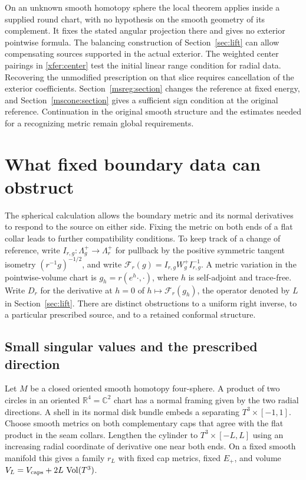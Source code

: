 \documentclass[11pt]{article}
\numberwithin{equation}{section}
\theoremstyle{definition}
\theoremstyle{remark}
\begin{document}
On an unknown smooth homotopy sphere the local theorem applies
inside a supplied round chart, with no hypothesis on the smooth
geometry of its complement. It fixes the stated angular projection
there and gives no exterior pointwise formula. The balancing
construction of Section~\ref{sec:lift} can allow compensating
sources supported in the actual exterior. The weighted center
pairings in \eqref{xfer:center} test the initial linear range
condition for radial data. Recovering the unmodified prescription
on that slice requires cancellation of the exterior coefficients.
Section~\ref{msreg:section} changes the reference at fixed energy, and
Section~\ref{mscone:section} gives a sufficient sign condition at the original reference.
Continuation in the original smooth structure and the estimates
needed for a recognizing metric remain global requirements.

\section{What fixed boundary data can obstruct}
\label{sec:collars}

The spherical calculation allows the boundary metric and its normal
derivatives to respond to the source on either side. Fixing the metric
on both ends of a flat collar leads to further compatibility conditions.
To keep track of a change of reference, write
\(I_{r,g}:\Lambda_g^+\to\Lambda_r^+\) for pullback by the positive
symmetric tangent isometry \((r^{-1}g)^{-1/2}\), and write
\(\mathcal F_r(g)=I_{r,g}W_g^+I_{r,g}^{-1}\). A metric variation in the
pointwise-volume chart is \(g_h=r(e^h\cdot,\cdot)\), where \(h\) is
self-adjoint and trace-free. Write \(D_r\) for the derivative at \(h=0\) of \(h\mapsto \mathcal F_r(g_h)\),
the operator denoted by \(L\) in Section~\ref{sec:lift}.
There are distinct obstructions to a uniform right inverse, to a
particular prescribed source, and to a retained conformal structure.

\subsection{Small singular values and the prescribed direction}

Let \(M\) be a closed oriented smooth homotopy four-sphere. A product of two circles in an oriented \(\mathbb R^4=\mathbb C^2\)
chart has a normal framing given by the two radial directions. A shell
in its normal disk bundle embeds a separating \(T^3\times[-1,1]\).
Choose smooth metrics on both complementary caps that agree with the flat
product in the seam collars. Lengthen the cylinder to
\(T^3\times[-L,L]\) using an increasing radial coordinate of derivative
one near both ends. On a fixed smooth manifold this gives a family
\(r_L\) with fixed cap metrics, fixed \(E_+\), and volume
\(V_L=V_{\rm caps}+2L\,\operatorname{Vol}(T^3)\).
\end{document}
